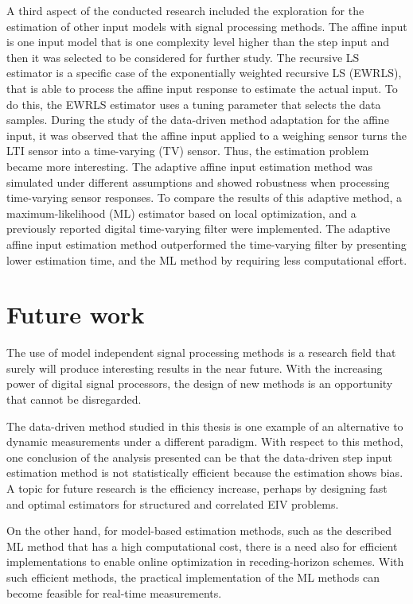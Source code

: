 A third aspect of the conducted research included the exploration for the estimation of other input models with signal processing methods. 
The affine input is one input model that is one complexity level higher than the step input and then it was selected to be considered for further study.
The recursive LS estimator is a specific case of the exponentially weighted recursive LS (EWRLS), that is able to process the affine input response to estimate the actual input.
To do this, the EWRLS estimator uses a tuning parameter that selects the data samples.
During the study of the data-driven method adaptation for the affine input, it was observed that the affine input applied to a weighing sensor turns the LTI sensor into a time-varying (TV) sensor. 
Thus, the estimation problem became more interesting.
The adaptive affine input estimation method was simulated under different assumptions and showed robustness when processing time-varying sensor responses.
To compare the results of this adaptive method, a maximum-likelihood (ML) estimator based on local optimization, and a previously reported digital time-varying filter were implemented.
The adaptive affine input estimation method outperformed the time-varying filter by presenting lower estimation time, and the ML method by requiring less computational effort. 


\section*{Future work}

The use of model independent signal processing methods is a research field that surely will produce interesting results in the near future. 
With the increasing power of digital signal processors, the design of new methods is an opportunity that cannot be disregarded.

The data-driven method studied in this thesis is one example of an alternative to dynamic measurements under a different paradigm.
With respect to this method, one conclusion of the analysis presented can be that the data-driven step input estimation method is not statistically efficient because the estimation shows bias.
A topic for future research is the efficiency increase, perhaps by designing fast and optimal estimators for structured and correlated EIV problems. 

On the other hand, for model-based estimation methods, such as the described ML method that has a high computational cost, there is a need also for efficient implementations to enable online optimization in receding-horizon schemes. 
With such efficient methods, the practical implementation of the ML methods can become feasible for real-time measurements.



